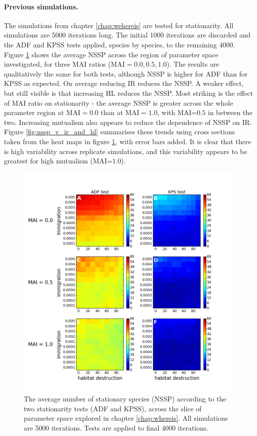 \paragraph*{Previous simulations.} The simulations from chapter \ref{chap:wehereis} are tested for stationarity. All simulations are 5000 iterations long. The initial 1000 iterations are discarded and the ADF and KPSS tests applied, species by species, to the remaining 4000. Figure \ref{fig:nssp_ir_v_hl} shows the average NSSP across the region of parameter space investigated, for three MAI ratios (MAI$=0.0,0.5,1.0$). The results are qualitatively the same for both tests, although NSSP is higher for ADF than for KPSS as expected. On average reducing IR reduces the NSSP. A weaker effect, but still visible is that increasing HL reduces the NSSP. Most striking is the effect of MAI ratio on stationarity - the average NSSP is greater across the whole parameter region at MAI$=0.0$ than at MAI$=1.0$, with MAI=$0.5$ in between the two. Increasing mutualism also appears to reduce the dependence of NSSP on IR.  Figure \ref{fig:nssp_v_ir_and_hl} summarises these trends using cross sections taken from the heat maps in figure \ref{fig:nssp_ir_v_hl}, with error bars added. It is clear that there is high variability across replicate simulations, and this variability appears to be greatest for high mutualism (MAI=$1.0$).

\begin{figure}[hp]
	\centering
	\includegraphics[width=1.0\linewidth]{"./chapters/chapter04b/figures/nssp_ir_v_hl"}
    \caption{The average number of stationary species (NSSP) according to the two stationarity tests (ADF and KPSS), across the slice of parameter space explored in chapter \ref{chap:whereis}. All simulations are 5000 iterations. Tests are applied to final 4000 iterations.}    
    \label{fig:nssp_ir_v_hl}
\end{figure}



